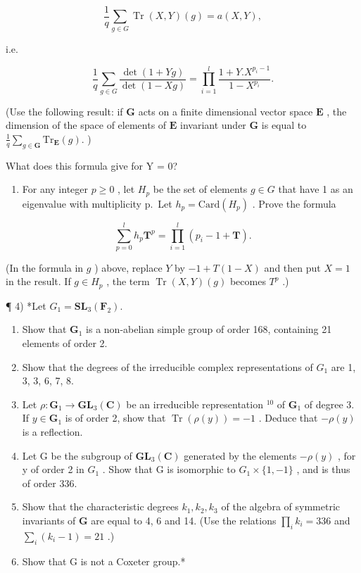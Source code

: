 \[
\frac {1}{q} \sum_ {g \in G} \operatorname{Tr} (X, Y) (g) = a (X, Y),
\]

i.e.

\[
\frac {1}{q} \sum_ {g \in G} \frac {\det (1 + Y g)}{\det (1 - X g)} = \prod_ {i = 1} ^ {l} \frac {1 + Y . X ^ {p _ {i} - 1}}{1 - X ^ {p _ {i}}}.
\]

(Use the following result: if \(\mathbf{G}\) acts on a finite dimensional vector space \(\mathbf{E}\) , the dimension of the space of elements of \(\mathbf{E}\) invariant under \(\mathbf{G}\) is equal to \(\frac{1}{q}\sum_{g\in \mathbf{G}}\mathrm{Tr}_{\mathbf{E}}(g).\) )

What does this formula give for Y = 0?

\begin{enumerate}
\def\labelenumi{\alph{enumi})}
\setcounter{enumi}{7}
\tightlist
\item
  For any integer \(p \geqslant 0\) , let \(H_{p}\) be the set of elements \(g \in G\) that have 1 as an eigenvalue with multiplicity p.~Let \(h_{p} = \text{Card}(H_{p})\) . Prove the formula
\end{enumerate}

\[
\sum_ {p = 0} ^ {l} h _ {p} \mathbf {T} ^ {p} = \prod_ {i = 1} ^ {l} (p _ {i} - 1 + \mathbf {T}).
\]

(In the formula in \(g\) ) above, replace \(Y\) by \(-1 + T(1 - X)\) and then put \(X = 1\) in the result. If \(g \in H_p\) , the term \(\operatorname{Tr}(X, Y)(g)\) becomes \(T^p\) .)

¶ 4) *Let \(G _ {1} = \mathbf {S L} _ {3} (\mathbf {F} _ {2})\).

\begin{enumerate}
\def\labelenumi{\alph{enumi})}
\item
  Show that \(\mathbf{G}_1\) is a non-abelian simple group of order 168, containing 21 elements of order 2.
\item
  Show that the degrees of the irreducible complex representations of \(G_{1}\) are 1, 3, 3, 6, 7, 8.
\item
  Let \(\rho: \mathbf{G}_1 \to \mathbf{GL}_3(\mathbf{C})\) be an irreducible representation \(^{10}\) of \(\mathbf{G}_1\) of degree 3. If \(y \in \mathbf{G}_1\) is of order 2, show that \(\operatorname{Tr}(\rho(y)) = -1\) . Deduce that \(-\rho(y)\) is a reflection.
\item
  Let G be the subgroup of \(\mathbf{GL}_{3}(\mathbf{C})\) generated by the elements \(-\rho(y)\) , for y of order 2 in \(G_{1}\) . Show that G is isomorphic to \(G_{1} \times \{1, -1\}\) , and is thus of order 336.
\item
  Show that the characteristic degrees \(k_{1}, k_{2}, k_{3}\) of the algebra of symmetric invariants of \(\mathbf{G}\) are equal to 4, 6 and 14. (Use the relations \(\prod_{i} k_{i} = 336\) and \(\sum_{i} (k_{i} - 1) = 21\) .)
\item
  Show that G is not a Coxeter group.*
\end{enumerate}

